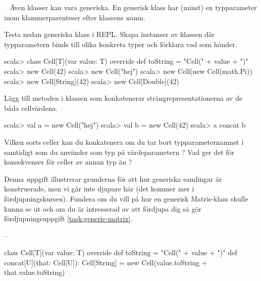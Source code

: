 \QUESTEND





\QUESTBEGIN

\Task  \what~  Även klasser kan vara generiska. En generisk klass har (minst) en typparameter inom klammerparenteser efter klassens namn.

\Subtask Testa nedan generiska klass  i REPL. Skapa instanser av klassen  där typparametern  binds till olika konkreta typer och förklara vad som händer.

\begin{REPL}
scala> class Cell[T](var value: T){
         override def toString = "Cell(" + value + ")"
       }
scala> new Cell(42)
scala> new Cell("hej")
scala> new Cell(new Cell(math.Pi))
scala> new Cell[String](42)
scala> new Cell[Double](42)
\end{REPL}

\Subtask Lägg till metoden  i klassen  som konkatenerar strängrepresentationerna av de båda cellvärdena.

\begin{REPL}
scala> val a = new Cell("hej")
scala> val b = new Cell(42)
scala> a concat b
\end{REPL}

\Subtask Vilken sorts celler kan du konkatenera om du tar bort typparameternamnet  i  samtidigt som du använder  som typ på värdeparametern ? Vad ger det för konsekvenser för celler av annan typ än ?

\Subtask Denna uppgift illustrerar grunderna för att hur generiska samlingar är konstruerade, men vi går inte djupare här (det kommer mer i fördjupningskursen). Fundera om du vill på hur en generisk Matris-klass skulle kunna se ut och om du är intresserad av att fördjupa dig så gör fördjupningsuppgift \ref{task:generic-matrix}.

\SOLUTION

\TaskSolved \what

\SubtaskSolved  --

\SubtaskSolved  \begin{Code}
class Cell[T](var value: T){
	override def toString = "Cell(" + value + ")"
	def concat[U](that: Cell[U]): Cell[String] =
		new Cell(value.toString + that.value.toString)
}
\end{Code}

